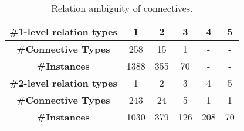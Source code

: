 \begin{table}[ht]
\centering
\begin{tabular}{|c|c|c|c|c|c|}
\hline
\bf \#1-level relation types & 1    & 2   & 3   & 4   & 5  \\ \hline
\bf \#Connective Types       & 258  & 15  & 1   & -   & -  \\ \hline
\bf \#Instances              & 1388 & 355 & 70  & -   & -  \\ \hline

\hhline{|=|=|=|=|=|=|}

\bf \#2-level relation types & 1    & 2   & 3   & 4   & 5  \\ \hline
\bf \#Connective Types       & 243  & 24  & 5   & 1   & 1  \\ \hline
\bf \#Instances              & 1030 & 379 & 126 & 208 & 70 \\ \hline

\end{tabular}
\caption{\label{t:connective-type} Relation ambiguity of connectives. }
\end{table}
